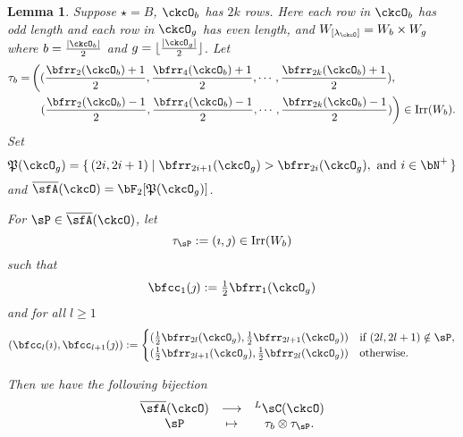 \documentclass[12pt,a4paper]{amsart}
\def\abs#1{\left|{#1}\right|}
\newcommand{\CQ}{{\mathcal {Q}}}
\numberwithin{equation}{section}
\newtheorem{lem}[thm]{Lemma}
\theoremstyle{remark}
\def\half{{\tfrac{1}{2}}}
\def\floor#1{{\lfloor #1 \rfloor}}
\def\Irr{\mathrm{Irr}}
\def\WLamck{W_{[\lambda_{\ckcO}]}}
\def\LC{{}^L\sC}
\def\CQ{\overline{\sfA}}%
\def\CPP{\mathfrak{P}}
\begin{document}
\begin{lem}
  Suppose $\star = B$, $\ckcO_{b}$ has $2k$ rows. Here each row in $\ckcO_{b}$ has
  odd length and each row in $\ckcO_{g}$ has even length, and
  $\WLamck = W_{b}\times W_{g}$ where $b= \frac{\abs{\ckcO_{b}}}{2}$ and
  $g = \floor{\frac{\abs{\ckcO_{g}}}{2}}$.
  Let
  \[
    \begin{split}
      \tau_{b} =  & \left( (\frac{\bfrr_{2}(\ckcO_{b})+1}{2}, \frac{\bfrr_{4}(\ckcO_{b})+1}{2}, \cdots, \frac{\bfrr_{2k}(\ckcO_{b})+1}{2}),\right.\\
        &\ \ \left. (\frac{\bfrr_{2}(\ckcO_{b})-1}{2}, \frac{\bfrr_{4}(\ckcO_{b})-1}{2}, \cdots, \frac{\bfrr_{2k}(\ckcO_{b})-1}{2})\right) \in \Irr(W_{b}).
    \end{split}
  \]
  Set
  \[
    \CPP(\ckcO_{g}) = \set{(2i,2i+1)| \bfrr_{2i+1}(\ckcO_{g})> \bfrr_{2i}(\ckcO_{g}), \text{
        and } i\in \bN^{+}}
  \]
  and $\CQ(\ckcO)= \bF_{2}[\CPP(\ckcO_{g})]$.

  For $\sP \in \CQ(\ckcO)$, let
  \[
    \tau_{\sP} := (\imath,\jmath) \in \Irr(W_{b})
  \]
  such that
  \[
    \bfcc_{1}(\jmath)  := \half\bfrr_{1}(\ckcO_{g})
  \]
  and for all $l\geq 1$
  \[
  (\bfcc_{l}(\imath), \bfcc_{l+1}(\jmath)):=
  \begin{cases}
    (\half \bfrr_{2l}(\ckcO_{g}), \half \bfrr_{2l+1}(\ckcO_{g}))
    & \text{if } (2l,2l+1)\notin \sP,\\
    (\half \bfrr_{2l+1}(\ckcO_{g}),\half \bfrr_{2l}(\ckcO_{g})) & \text{otherwise.}
  \end{cases}
  \]

  Then we have the following bijection
  \[
    \begin{array}{ccc}
      \CQ(\ckcO) &\longrightarrow & \LC(\ckcO)\\
      \sP & \mapsto & \tau_{b}\otimes \tau_{\sP}.
    \end{array}
  \]
\end{lem}
\end{document}
